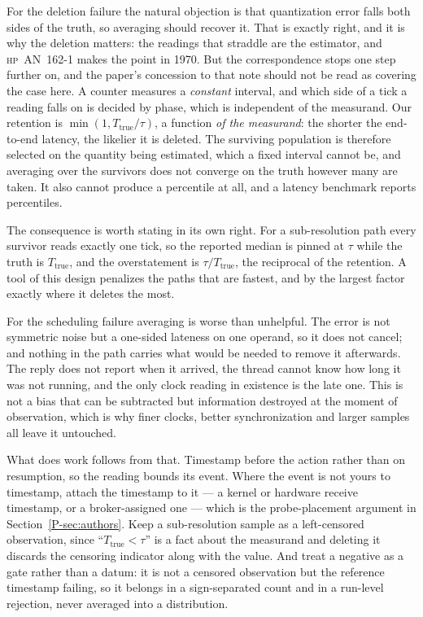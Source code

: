 \documentclass[10pt,journal,onecolumn]{IEEEtran}
\newcommand{\mainAuthors}{\ref{P-sec:authors}}        %
\begin{document}
For the deletion failure the natural objection is that quantization error falls both sides of the truth, so
averaging should recover it. That is exactly right, and it is why the deletion matters: the
readings that straddle are the estimator, and \textsc{hp}~AN~162-1 makes the point in 1970.
But the correspondence stops one step further on, and the paper's concession to that note
should not be read as covering the case here. A counter measures a \emph{constant} interval,
and which side of a tick a reading falls on is decided by phase, which is independent of the
measurand. Our retention is $\min(1, T_{\mathrm{true}}/\tau)$, a function \emph{of the
measurand}: the shorter the end-to-end latency, the likelier it is deleted. The surviving population is
therefore selected on the quantity being estimated, which a fixed interval cannot be, and
averaging over the survivors does not converge on the truth however many are taken. It also
cannot produce a percentile at all, and a latency benchmark reports percentiles.

The consequence is worth stating in its own right. For a sub-resolution path every survivor
reads exactly one tick, so the reported median is pinned at $\tau$ while the truth is
$T_{\mathrm{true}}$, and the overstatement is $\tau/T_{\mathrm{true}}$, the reciprocal of the
retention. A tool of this design penalizes the paths that are fastest, and by the largest
factor exactly where it deletes the most.

For the scheduling failure averaging is worse than unhelpful. The error is not symmetric noise but a
one-sided lateness on one operand, so it does not cancel; and nothing in the path carries what
would be needed to remove it afterwards. The reply does not report when it arrived, the thread
cannot know how long it was not running, and the only clock reading in existence is the late
one. This is not a bias that can be subtracted but information destroyed at the moment of
observation, which is why finer clocks, better synchronization and larger samples all leave it
untouched.

What does work follows from that. Timestamp before the action rather than on resumption, so the
reading bounds its event. Where the event is not yours to timestamp, attach the timestamp to it ---
a kernel or hardware receive timestamp, or a broker-assigned one --- which is the
probe-placement argument in Section~\mainAuthors{}. Keep a sub-resolution sample as a left-censored
observation, since ``$T_{\mathrm{true}} < \tau$'' is a fact about the measurand and deleting
it discards the censoring indicator along with the value. And treat a negative as a gate
rather than a datum: it is not a censored observation but the reference timestamp failing, so it
belongs in a sign-separated count and in a run-level rejection, never averaged into a
distribution.
\end{document}
